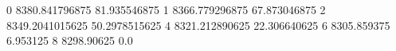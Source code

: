 0 8380.841796875 81.935546875
1 8366.779296875 67.873046875
2 8349.2041015625 50.2978515625
4 8321.212890625 22.306640625
6 8305.859375 6.953125
8 8298.90625 0.0
